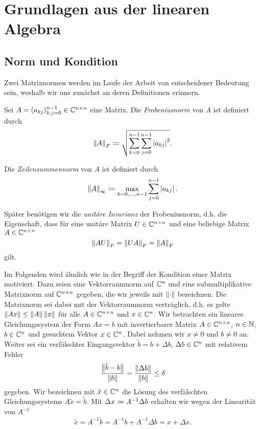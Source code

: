 \chapter{Grundlagen aus der linearen Algebra}
\section{Norm und Kondition}
Zwei Matrixnormen werden im Laufe der Arbeit von entscheidener Bedeutung sein,
weshalb wir uns zunächst an deren Definitionen erinnern.

\begin{mydef}
    Sei $A = (a_{kj})_{k,j=0}^{n-1} \in \mathbb{C}^{n\times n}$ eine Matrix.
    Die \emph{Frobeniusnorm} von $A$ ist definiert durch
    \begin{equation}
        \label{eq:frobenius_norm}
        \left\lVert A \right\rVert_F
        \coloneqq \sqrt{ \sum_{k=0}^{n-1} \sum_{j=0}^{n-1} \left\lvert a_{kj} \right\rvert^2}.
    \end{equation}

    \noindent Die \emph{Zeilensummennorm} von $A$ ist definiert durch
    \begin{equation}
        \label{eq:infinity_norm}
        \left\lVert A \right\rVert_\infty
        \coloneqq \max_{k=0, \dots, n-1} \sum_{j=0}^{n-1} \left\lvert a_{kj} \right\rvert.
    \end{equation}
\end{mydef}

\begin{remark}
    Später benötigen wir die \emph{unitäre Invarianz} der
    Frobeniusnorm, d.h. die Eigenschaft, dass für eine unitäre Matrix
    $U \in \mathbb{C}^{n\times n}$ und eine beliebige Matrix ${A \in \mathbb{C}^{n\times n}}$
    \[
        \left\lVert A U \right\rVert_F = \left\lVert U A \right\rVert_F = \left\lVert A \right\rVert_F
    \]
    gilt.
\end{remark}

Im Folgenden wird ähnlich wie in \cite[S. 205ff]{stoer1} der Begriff der Kondition
einer Matrix motiviert.  Dazu seien eine Vektorraumnorm auf $\mathbb{C}^n$ und eine
submultiplikative Matrixnorm auf $\mathbb{C}^{n\times n}$ gegeben, die wir jeweils mit
$\left\lVert \cdot \right\rVert$ bezeichnen. Die Matrixnorm sei dabei mit der Vektorraumnorm
verträglich, d.h. es gelte $ \left\lVert Ax \right\rVert \leq \left\lVert A \right\rVert\left\lVert x \right\rVert$ für alle $A \in
\mathbb{C}^{n\times n}$ und $x \in \mathbb{C}^n$.
Wir betrachten ein lineares Gleichungssystem der Form
$Ax = b$ mit invertierbarer Matrix
$A \in \mathbb{C}^{n \times n}$, $n \in \mathbb{N}$, $b \in \mathbb{C}^n$
und gesuchtem Vektor $x \in \mathbb{C}^n$.
Dabei nehmen wir $x \neq 0$ und $b \neq 0$ an.
Weiter sei ein verfälschter Eingangsvektor $\tilde{b} = b + \Delta b$,
$\Delta b \in \mathbb{C}^n$ mit relativem Fehler
\[
    \frac{\left\lVert \tilde{b} - b \right\rVert}{\left\lVert b \right\rVert} = \frac{\left\lVert \Delta b \right\rVert}{\left\lVert b \right\rVert} \leq \delta
\]
gegeben.
Wir bezeichnen mit $\tilde{x} \in \mathbb{C}^n$ die Lösung des verfälschten Gleichungssystems
$A \tilde{x} = \tilde{b}$.
Mit $\Delta x \coloneqq A^{-1} \Delta b$ erhalten wir wegen der Linearität von $A^{-1}$
\[
    \tilde{x} = A^{-1} \tilde{b} = A^{-1} b + A^{-1} \Delta b = x + \Delta x.
\]

